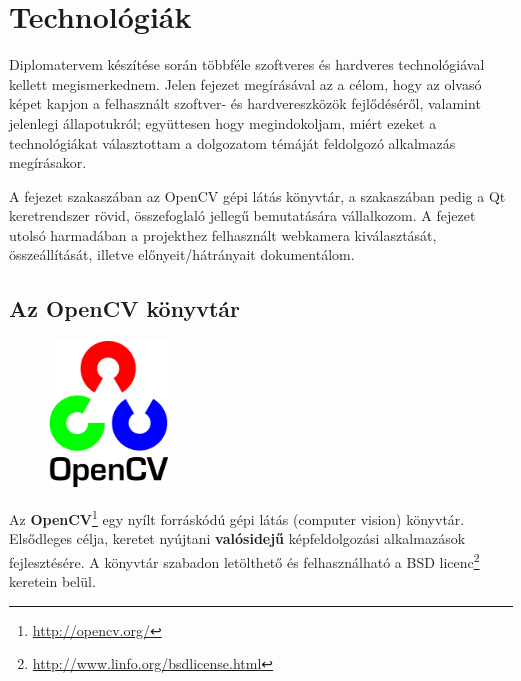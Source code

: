 \chapter{Technológiák}\label{sect:technologia}

Diplomatervem készítése során többféle szoftveres és hardveres technológiával kellett megismerkednem. Jelen fejezet megírásával az a célom, hogy az olvasó képet kapjon a felhasznált szoftver- és hardvereszközök fejlődéséről, valamint jelenlegi állapotukról; együttesen hogy megindokoljam, miért ezeket a technológiákat választottam a dolgozatom témáját feldolgozó alkalmazás megírásakor.

\bigskip

A fejezet  szakaszában az OpenCV gépi látás könyvtár, a  szakaszában pedig a Qt keretrendszer rövid, összefoglaló jellegű bemutatására vállalkozom. A fejezet utolsó harmadában a projekthez felhasznált webkamera kiválasztását, összeállítását, illetve előnyeit/hátrányait dokumentálom. 

\section{Az OpenCV könyvtár}\label{sect:opencv}

\begin{figure}
  \begin{center}
    \includegraphics[width=0.28\textwidth]{figures/opencv_logo.png}
  \end{center}
\end{figure}

Az \textbf{OpenCV}\footnote{\url{http://opencv.org/}} egy nyílt forráskódú gépi látás (computer vision) könyvtár. Elsődleges célja, keretet nyújtani \textbf{valósidejű} képfeldolgozási alkalmazások fejlesztésére. A könyvtár szabadon letölthető és felhasználható a BSD licenc\footnote{\url{http://www.linfo.org/bsdlicense.html}} keretein belül. \cite{opencv_wiki}

